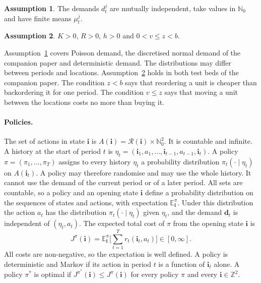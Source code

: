 \documentclass[11pt]{article}
\renewcommand{\vec}[1]{\boldsymbol{#1}}
\newcommand{\E}{\mathbb{E}}
\newcommand{\Z}{\mathbb{Z}}
\newcommand{\N}{\mathbb{N}_0}
\newcommand{\R}{\mathcal{R}}
\theoremstyle{definition}
\newtheorem{assumption}{Assumption}
\begin{document}
\begin{assumption}\label{ass:demand}
The demands $d^j_t$ are mutually independent, take values in $\N$ and have finite means $\mu^j_t$.
\end{assumption}

\begin{assumption}\label{ass:cost}
$K>0$, $R>0$, $h>0$ and $0<v\le z<b$.
\end{assumption}

Assumption~\ref{ass:demand} covers Poisson demand, the discretised normal demand of the companion paper and deterministic demand. The distributions may differ between periods and locations. Assumption~\ref{ass:cost} holds in both test beds of the companion paper. The condition $z<b$ says that reordering a unit is cheaper than backordering it for one period. The condition $v\le z$ says that moving a unit between the locations costs no more than buying it.

\paragraph{Policies.} The set of actions in state $\vec{i}$ is $A(\vec{i})=\R(\vec{i})\times\N^2$. It is countable and infinite. A history at the start of period $t$ is $\eta_t=(\vec{i}_1,a_1,\ldots,\vec{i}_{t-1},a_{t-1},\vec{i}_t)$. A policy $\pi=(\pi_1,\ldots,\pi_T)$ assigns to every history $\eta_t$ a probability distribution $\pi_t(\cdot\mid\eta_t)$ on $A(\vec{i}_t)$. A policy may therefore randomise and may use the whole history. It cannot use the demand of the current period or of a later period. All sets are countable, so a policy and an opening state $\vec{i}$ define a probability distribution on the sequences of states and actions, with expectation $\E^\pi_{\vec{i}}$. Under this distribution the action $a_t$ has the distribution $\pi_t(\cdot\mid\eta_t)$ given $\eta_t$, and the demand $\vec{d}_t$ is independent of $(\eta_t,a_t)$. The expected total cost of $\pi$ from the opening state $\vec{i}$ is
\[
J^\pi(\vec{i})=\E^\pi_{\vec{i}}\Big[\sum_{t=1}^T r_t(\vec{i}_t,a_t)\Big]\in[0,\infty].
\]
All costs are non-negative, so the expectation is well defined. A policy is deterministic and Markov if its action in period $t$ is a function of $\vec{i}_t$ alone. A policy $\pi^*$ is optimal if $J^{\pi^*}(\vec{i})\le J^{\pi}(\vec{i})$ for every policy $\pi$ and every $\vec{i}\in\Z^2$.
\end{document}
